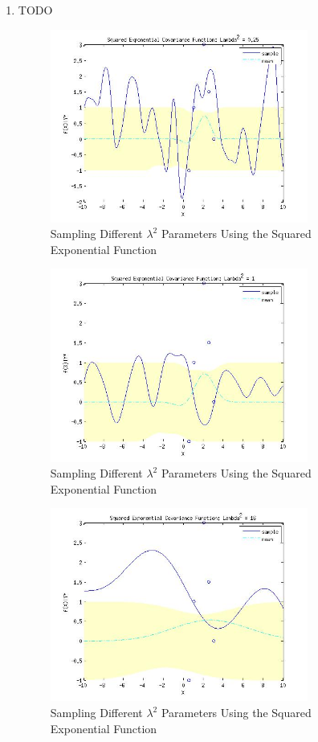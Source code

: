 \documentclass{article}
\begin{document}
\begin{enumerate}[label=(\alph*)]
\item TODO

\begin{figure}[H]
\centering
\includegraphics[width=0.8\textwidth]{1_f_1.jpg}
\caption{Sampling Different $\lambda^2$ Parameters Using the Squared Exponential Function}
\label{fig:1f1}
\end{figure}

\begin{figure}[H]
\centering
\includegraphics[width=0.8\textwidth]{1_f_2.jpg}
\caption{Sampling Different $\lambda^2$ Parameters Using the Squared Exponential Function}
\label{fig:1f2}
\end{figure}

\begin{figure}[H]
\centering
\includegraphics[width=0.8\textwidth]{1_f_3.jpg}
\caption{Sampling Different $\lambda^2$ Parameters Using the Squared Exponential Function}
\label{fig:1f3}
\end{figure}

\end{enumerate}
\end{document}
